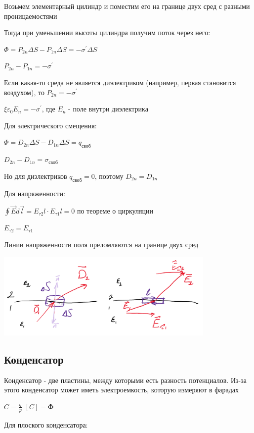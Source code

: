\documentclass[12pt]{article}
\begin{document}
Возьмем элементарный цилиндр и поместим его на границе двух сред с разными проницаемостями

Тогда при уменьшении высоты цилиндра получим поток через него:

$\Phi = P_{2n} \Delta S - P_{1n} \Delta S = -\sigma^\prime \Delta S$

$P_{2n} - P_{1n} = -\sigma^\prime$

Если какая-то среда не является диэлектриком (например, первая становится воздухом), то $P_{2n} = -\sigma^\prime$

$\xi\varepsilon_0 E_n = -\sigma^\prime$, где $E_n$ - поле внутри диэлектрика

Для электрического смещения:

$\Phi = D_{2n} \Delta S - D_{1n} \Delta S = q_\text{своб}$

$D_{2n} - D_{1n} = \sigma_\text{своб}$ 

Но для диэлектриков $q_\text{своб} = 0$, поэтому $D_{2n} = D_{1n}$

Для напряженности:

$\oint \vec{E} d\vec{l} = E_{\tau 2} l \cdot E_{\tau 1} l = 0$ по теореме о циркуляции

$E_{\tau 2} = E_{\tau 1}$

Линии напряженности поля преломляются на границе двух сред

\begin{center}
    \includegraphics[width=0.8\textwidth]{physics1/images/physics1_2024_12_09_2}
\end{center}

\subsection{Конденсатор}

Конденсатор - две пластины, между которыми есть разность потенциалов. Из-за этого конденсатор может иметь электроемкость, которую измеряют в фарадах

$C = \frac{q}{\varphi}$ \hfill $[C] = \text{Ф}$

Для плоского конденсатора:
\end{document}
